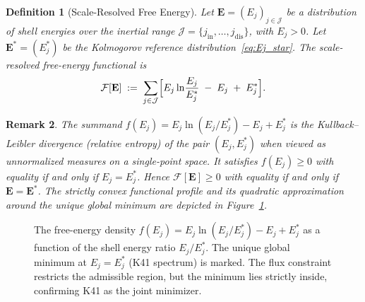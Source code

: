 \documentclass[12pt,a4paper]{article}
\theoremstyle{breakdef}
\newtheorem{definition}{Definition}[section]
\theoremstyle{breakplain}
\theoremstyle{breakdef}
\newtheorem{remark}[definition]{Remark}
\begin{document}
\begin{definition}[Scale-Resolved Free Energy]\label{def:F}
Let $\mathbf{E} = (E_j)_{j \in \mathcal{J}}$ be a distribution of shell
energies over the inertial range $\mathcal{J} = \{j_{\mathrm{in}}, \dots,
j_{\mathrm{dis}}\}$, with $E_j > 0$.  Let $\mathbf{E}^* = (E_j^*)$ be
the Kolmogorov reference distribution~\eqref{eq:Ej_star}.  The
\emph{scale-resolved free-energy functional} is
\begin{equation}\label{eq:F}
  \mathcal{F}[\mathbf{E}]
  \;:=\;
  \sum_{j \in \mathcal{J}}
  \Bigl[
    E_j \ln\!\frac{E_j}{E_j^*} \;-\; E_j \;+\; E_j^*
  \Bigr].
\end{equation}
\end{definition}

\begin{remark}
The summand $f(E_j) = E_j \ln(E_j/E_j^*) - E_j + E_j^*$ is the
Kullback--Leibler divergence (relative entropy) of the pair $(E_j, E_j^*)$
when viewed as unnormalized measures on a single-point space.  It satisfies
$f(E_j) \ge 0$ with equality if and only if $E_j = E_j^*$.  Hence
$\mathcal{F}[\mathbf{E}] \ge 0$ with equality if and only if $\mathbf{E} = \mathbf{E}^*$. The strictly convex functional profile and its quadratic approximation around the unique global minimum are depicted in Figure~\ref{fig:FE-landscape}.
\end{remark}

\begin{figure}[ht]
\centering
{}
\caption{The free-energy density $f(E_j) = E_j \ln(E_j / E_j^*) - E_j + E_j^*$
as a function of the shell energy ratio $E_j / E_j^*$. The unique global minimum
at $E_j = E_j^*$ (K41 spectrum) is marked. The flux constraint restricts the
admissible region, but the minimum lies strictly inside, confirming K41 as the
joint minimizer.}
\label{fig:FE-landscape}
\end{figure}
\end{document}
